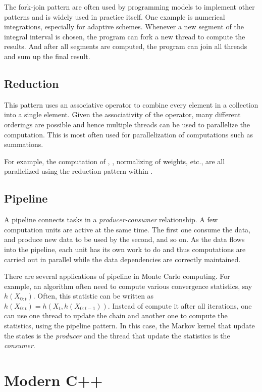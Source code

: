 The fork-join pattern are often used by programming models to implement other
patterns and is widely used in practice itself. One example is numerical
integrations, especially for adaptive schemes. Whenever a new segment of the
integral interval is chosen, the program can fork a new thread to compute the
results. And after all segments are computed, the program can join all threads
and sum up the final result.

\subsection{Reduction}
\label{sub:Reduction}

This pattern uses an associative operator to combine every element in a
collection into a single element. Given the associativity of the operator,
many different orderings are possible and hence multiple threads can be used
to parallelize the computation. This is most often used for parallelization of
computations such as summations.

For example, the computation of \ess, \cess, normalizing of weights, etc., are
all parallelized using the reduction pattern within \vsmc.

\subsection{Pipeline}
\label{sub:Pipeline}

A pipeline connects tasks in a \emph{producer-consumer} relationship. A few
computation units are active at the same time. The first one consume the data,
and produce new data to be used by the second, and so on. As the data flows
into the pipeline, each unit has its own work to do and thus computations are
carried out in parallel while the data dependencies are correctly maintained.

There are several applications of pipeline in Monte Carlo computing. For
example, an \mcmc algorithm often need to compute various convergence
statistics, say $h(X_{0:t})$. Often, this statistic can be written as
$h(X_{0:t}) = h(X_t, h(X_{0:{t-1}}))$. Instead of compute it after all
iterations, one can use one thread to update the \mcmc chain and another one
to compute the statistics, using the pipeline pattern. In this case, the
Markov kernel that update the states is the \emph{producer} and the thread
that update the statistics is the \emph{consumer}.

\section{Modern C++}
\label{sec:Modern C++}

